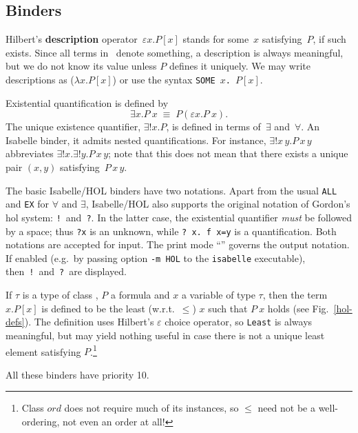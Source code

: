 \subsection{Binders}

Hilbert's {\bf description} operator~$\varepsilon x. P[x]$ stands for
some~$x$ satisfying~$P$, if such exists.  Since all terms in \HOL\ 
denote something, a description is always meaningful, but we do not
know its value unless $P$ defines it uniquely.  We may write
descriptions as ($\lambda x. P[x]$) or use the syntax
\hbox{\tt SOME~$x$.~$P[x]$}.

Existential quantification is defined by
\[ \exists x. P~x \;\equiv\; P(\varepsilon x. P~x). \]
The unique existence quantifier, $\exists!x. P$, is defined in terms
of~$\exists$ and~$\forall$.  An Isabelle binder, it admits nested
quantifications.  For instance, $\exists!x\,y. P\,x\,y$ abbreviates
$\exists!x. \exists!y. P\,x\,y$; note that this does not mean that there
exists a unique pair $(x,y)$ satisfying~$P\,x\,y$.

\medskip

 The
basic Isabelle/HOL binders have two notations.  Apart from the usual
\texttt{ALL} and \texttt{EX} for $\forall$ and $\exists$, Isabelle/HOL also
supports the original notation of Gordon's {\sc hol} system: \texttt{!}\ 
and~\texttt{?}.  In the latter case, the existential quantifier \emph{must} be
followed by a space; thus {\tt?x} is an unknown, while \verb'? x. f x=y' is a
quantification.  Both notations are accepted for input.  The print mode
``\ttindexbold{HOL}'' governs the output notation.  If enabled (e.g.\ by
passing option \texttt{-m HOL} to the \texttt{isabelle} executable),
then~{\tt!}\ and~{\tt?}\ are displayed.

\medskip

If $\tau$ is a type of class , $P$ a formula and $x$ a
variable of type $\tau$, then the term ~$x. P[x]$ is defined
to be the least (w.r.t.\ $\le$) $x$ such that $P~x$ holds (see
Fig.~\ref{hol-defs}).  The definition uses Hilbert's $\varepsilon$
choice operator, so \texttt{Least} is always meaningful, but may yield
nothing useful in case there is not a unique least element satisfying
$P$.\footnote{Class $ord$ does not require much of its instances, so
  $\le$ need not be a well-ordering, not even an order at all!}

\medskip All these binders have priority 10.

